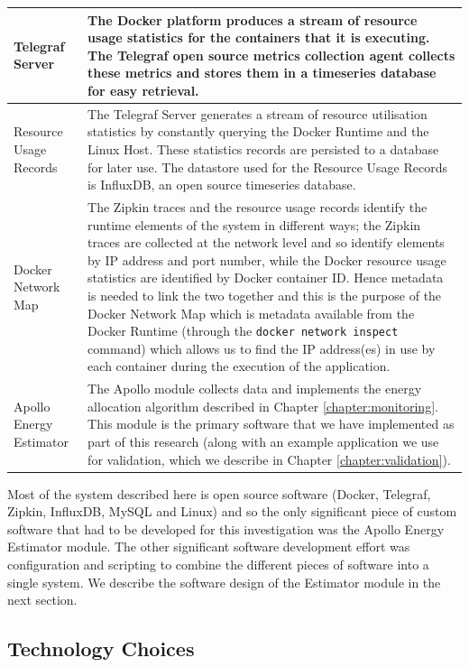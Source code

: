 \begin{table}
\begin{tabular}{|l|p{10cm}|}
\hline
Telegraf Server & The Docker platform produces a stream of resource usage statistics for the containers that it is executing.  The Telegraf open source metrics collection agent collects these metrics and stores them in a timeseries database for easy retrieval. \\
\hline
Resource Usage Records & The Telegraf Server generates a stream of resource utilisation statistics by constantly querying the Docker Runtime and the Linux Host.  These statistics records are persisted to a database for later use.  The datastore used for the Resource Usage Records is InfluxDB, an open source timeseries database. \\
\hline
Docker Network Map & The Zipkin traces and the resource usage records identify the runtime elements of the system in different ways; the Zipkin traces are collected at the network level and so identify elements by IP address and port number, while the Docker resource usage statistics are identified by Docker container ID.  Hence metadata is needed to link the two together and this is the purpose of the Docker Network Map which is metadata available from the Docker Runtime (through the \texttt{docker network inspect} command) which allows us to find the IP address(es) in use by each container during the execution of the application. \\
\hline
Apollo Energy Estimator & The Apollo module collects data and implements the energy allocation algorithm described in Chapter \ref{chapter:monitoring}.  This module is the primary software that we have implemented as part of this research (along with an example application we use for validation, which we describe in Chapter \ref{chapter:validation}). \\
\hline
\end{tabular}
\end{table}

Most of the system described here is open source software (Docker, Telegraf, Zipkin, InfluxDB, MySQL and Linux) and so the only significant piece of custom software that had to be developed for this investigation was the Apollo Energy Estimator module.  The other significant software development effort was configuration and scripting to combine the different pieces of software into a single system.  We describe the software design of the Estimator module in the next section.

\subsection{Technology Choices}


